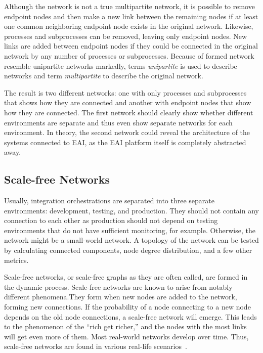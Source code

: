 \documentclass[english, 12pt, a4paper, sci, utf8, a-2b, online, obeyspaces]{aaltothesis}
\begin{document}
Although the network is not a true multipartite network, it is possible to remove endpoint nodes and then make a new link between the remaining nodes if at least one common neighboring endpoint node exists in the original network. Likewise, processes and subprocesses can be removed, leaving only endpoint nodes. New links are added between endpoint nodes if they could be connected in the original network by any number of processes or subprocesses. Because of formed network resemble unipartite networks markedly, terms \textit{unipartite} is used to describe networks and term \textit{multipartite} to describe the original network. 

The result is two different networks: one with only processes and subprocesses that shows how they are connected and another with endpoint nodes that show how they are connected. The first network should clearly show whether different environments are separate and thus even show separate networks for each environment. In theory, the second network could reveal the architecture of the systems connected to EAI, as the EAI platform itself is completely abstracted away.


\subsection{Scale-free Networks}
\label{sec:scale_free_networks}
Usually, integration orchestrations are separated into three separate environments: development, testing, and production. They should not contain any connection to each other as production should not depend on testing environments that do not have sufficient monitoring, for example. Otherwise, the network might be a small-world network. A topology of the network can be tested by calculating connected components, node degree distribution, and a few other metrics. 

Scale-free networks, or scale-free graphs as they are often called, are formed in the dynamic process. Scale-free networks are known to arise from notably different phenomena.They form when new nodes are added to the network, forming new connections. If the probability of a node connecting to a new node depends on the old node connections, a scale-free network will emerge.  This leads to the phenomenon of the “rich get richer,” and the nodes with the most links will get even more of them. Most real-world networks develop over time. Thus, scale-free networks are found in various real-life scenarios~\cite{buchanan2002nexus}.

\clearpage
\end{document}
